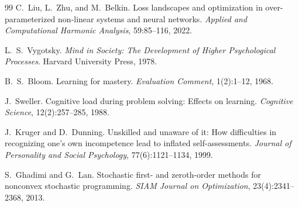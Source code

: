 \documentclass[11pt,a4paper]{article}
\theoremstyle{remark}
\begin{document}
\begin{thebibliography}{99}
C.~Liu, L.~Zhu, and M.~Belkin.
\newblock Loss landscapes and optimization in over-parameterized non-linear
  systems and neural networks.
\newblock \emph{Applied and Computational Harmonic Analysis}, 59:85--116, 2022.

L.~S.~Vygotsky.
\newblock \emph{Mind in Society: The Development of Higher Psychological Processes}.
\newblock Harvard University Press, 1978.

B.~S.~Bloom.
\newblock Learning for mastery.
\newblock \emph{Evaluation Comment}, 1(2):1--12, 1968.

J.~Sweller.
\newblock Cognitive load during problem solving: Effects on learning.
\newblock \emph{Cognitive Science}, 12(2):257--285, 1988.

J.~Kruger and D.~Dunning.
\newblock Unskilled and unaware of it: How difficulties in recognizing one's own
  incompetence lead to inflated self-assessments.
\newblock \emph{Journal of Personality and Social Psychology}, 77(6):1121--1134, 1999.

S.~Ghadimi and G.~Lan.
\newblock Stochastic first- and zeroth-order methods for nonconvex stochastic
  programming.
\newblock \emph{SIAM Journal on Optimization}, 23(4):2341--2368, 2013.

\end{thebibliography}
\end{document}
